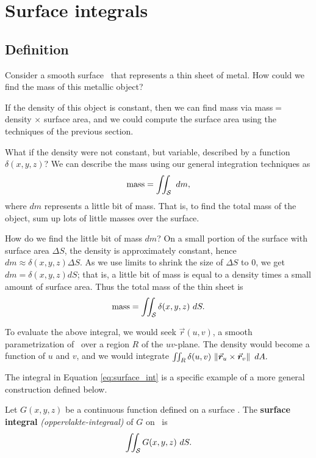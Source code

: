 \section{Surface integrals}\label{sec:surf_int}
\subsection{Definition}

Consider a smooth surface \surfaceS\ that represents a thin sheet of metal. How could we find the mass of this metallic object?

If the density of this object is constant, then we can find mass via mass$=$ density $\times$ surface area, and we could compute the surface area using the techniques of the previous section. 

What if the density were not constant, but variable, described by a function $\delta(x,y,z)$? We can describe the mass using our general integration techniques as
$$\text{mass} = \iint_\surfaceS \ dm,$$
where $dm$ represents a little bit of mass. That is, to find the total mass of the object, sum up lots of little masses over the surface.

How do we find the little bit of mass $dm$? On a small portion of the surface with surface area $\Delta S$, the density is approximately constant, hence $dm \approx \delta(x,y,z)\Delta S$. As we use limits to shrink the size of $\Delta S$ to 0, we get $dm = \delta(x,y,z)dS$; that is, a little bit of mass is equal to a density times a small amount of surface area. Thus the total mass of the thin sheet is
\begin{equation}
\text{mass} =\iint_\surfaceS \delta(x,y,z)\ dS.\label{eq:surface_int}
\end{equation}

To evaluate the above integral, we would seek $\vec r(u,v)$, a smooth parametrization of \surfaceS\ over a region $R$ of the $uv$-plane. The density would become a function of $u$ and $v$, and we would integrate $\iint_R \delta(u,v)\ \norm{\vec r_u\times \vec r_v}\ dA.$

The integral in Equation \eqref{eq:surface_int} is a specific example of a more general construction defined below.


\begin{definition}
\label{def:surface_integral}
Let $G(x,y,z)$ be a continuous function defined on a surface \surfaceS. The \textbf{surface integral} \textit{(oppervlakte-integraal)} of $G$ on \surfaceS\ is
$$\iint_\surfaceS G(x,y,z)\ dS.$$
\end{definition}

